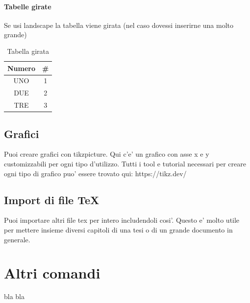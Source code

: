 \documentclass[12pt,a4paper,twoside]{book}
\begin{document}
\subsubsection{Tabelle girate}
Se usi landscape la tabella viene girata (nel caso dovessi inserirne una molto grande)
\begin{landscape}
\begin{table}[H]
    \centering
    \begin{tabular}{|c|c|}
    \hline
        \textbf{Numero} & \textbf{\#}  \\ \hline
        UNO & 1  \\ \hline
        DUE & 2  \\ \hline
        TRE & 3  \\ \hline
    \end{tabular}
    \caption{Tabella girata}
    \label{tab:girata}
\end{table}

\end{landscape}

\section{Grafici}
Puoi creare grafici con tikzpicture.
Qui c'e' un grafico con asse x e y customizzabili per ogni tipo d'utilizzo.
Tutti i tool e tutorial necessari per creare ogni tipo di grafico puo' essere trovato qui: https://tikz.dev/


\section{Import di file TeX}
Puoi importare altri file tex per intero includendoli cosi'.
Questo e' molto utile per mettere insieme diversi capitoli di una tesi o di un grande documento in generale.



\chapter{Altri comandi}
bla bla
\end{document}
